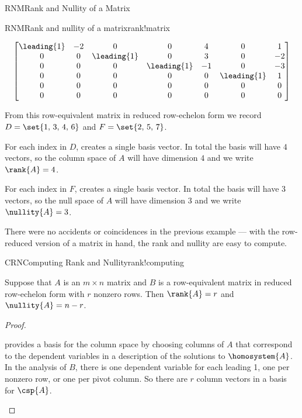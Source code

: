 \begin{subsect}{RNM}{Rank and Nullity of a Matrix}
\begin{example}{RNM}{Rank and nullity of a matrix}{rank!matrix}
\begin{para}
\begin{equation*}
\begin{bmatrix}
\leading{1} & -2 & 0 & 0 & 4 & 0 & 1\\
0 & 0 & \leading{1} & 0 & 3 & 0 & -2\\
0 & 0 & 0 & \leading{1} & -1 & 0 & -3\\
0 & 0 & 0 & 0 & 0 & \leading{1} & 1\\
0 & 0 & 0 & 0 & 0 & 0 & 0\\
0 & 0 & 0 & 0 & 0 & 0 & 0
\end{bmatrix}
\end{equation*}
\end{para}
%
\begin{para}From this row-equivalent matrix in reduced row-echelon form we record $D=\set{1,\,3,\,4,\,6}$ and $F=\set{2,\,5,\,7}$.\end{para}
%
\begin{para}For each index in $D$,  creates a single basis vector.  In total the basis will have $4$ vectors, so the column space of $A$ will have dimension $4$ and we write $\rank{A}=4$.\end{para}
%
\begin{para}For each index in $F$,  creates a single basis vector.  In total the basis will have $3$ vectors, so the null space of $A$ will have dimension $3$ and we write $\nullity{A}=3$.\end{para}
%
\end{example}
%
\begin{para}There were no accidents or coincidences in the previous example --- with the row-reduced version of a matrix in hand, the rank and nullity are easy to compute.\end{para}
%
\begin{theorem}{CRN}{Computing Rank and Nullity}{rank!computing}
\begin{para}Suppose that $A$ is an $m\times n$ matrix and $B$ is a row-equivalent matrix in reduced row-echelon form with $r$ nonzero rows.  Then $\rank{A}=r$ and $\nullity{A}=n-r$.\end{para}
\end{theorem}
%
\begin{proof}
\begin{para} provides a basis for the column space by choosing columns of $A$ that correspond to the dependent variables in a description of the solutions to $\homosystem{A}$.  In the analysis of $B$, there is one dependent variable for each leading 1, one per nonzero row, or one per pivot column.  So there are $r$ column vectors in a basis for $\csp{A}$.\end{para}

\end{proof}
\end{subsect}
